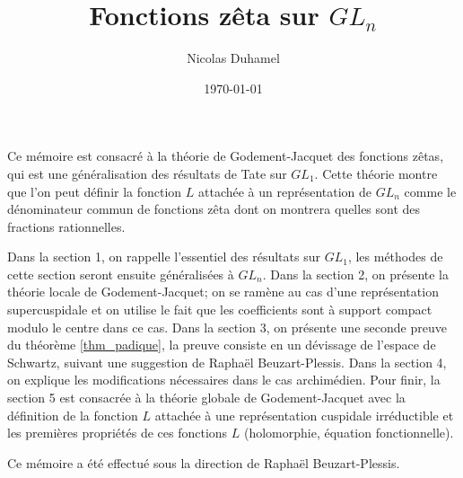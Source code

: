\documentclass{amsart}
\begin{document}
\title{Fonctions zêta sur $GL_n$}
\author{Nicolas Duhamel}
\date{\today}
\maketitle

Ce mémoire est consacré à la théorie de Godement-Jacquet \cite{godement-jacquet} des fonctions zêtas, qui est une généralisation des résultats de Tate \cite{tate} sur $GL_1$. Cette théorie montre que l'on peut définir la fonction $L$ attachée à un représentation de $GL_n$ comme le dénominateur commun de fonctions zêta dont on montrera quelles sont des fractions rationnelles.

Dans la section 1, on rappelle l'essentiel des résultats sur $GL_1$, les méthodes de cette section seront ensuite généralisées à $GL_n$. Dans la section 2, on présente la théorie locale de Godement-Jacquet; on se ramène au cas d'une représentation supercuspidale et on utilise le fait que les coefficients sont à support compact modulo le centre dans ce cas. Dans la section 3, on présente une seconde preuve du théorème \ref{thm_padique}, la preuve consiste en un dévissage de l'espace de Schwartz, suivant une suggestion de Raphaël Beuzart-Plessis. Dans la section 4, on explique les modifications nécessaires dans le cas archimédien. Pour finir, la section 5 est consacrée à la théorie globale de Godement-Jacquet avec la définition de la fonction $L$ attachée à une représentation cuspidale irréductible et les premières propriétés de ces fonctions $L$ (holomorphie, équation fonctionnelle).

Ce mémoire a été effectué sous la direction de Raphaël Beuzart-Plessis.

\tableofcontents











 
\end{document}
